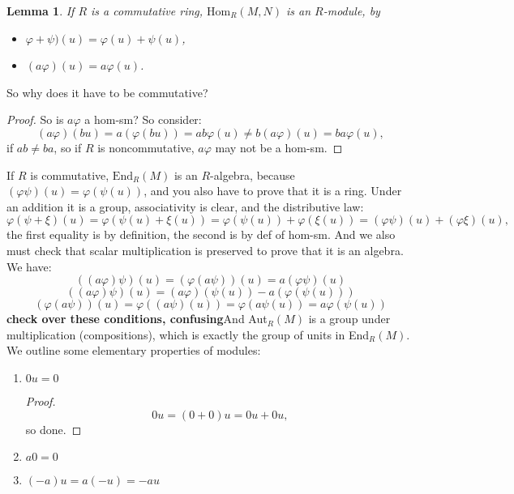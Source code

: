 \documentclass[9pt,reqno,twoside]{amsbook}
\theoremstyle{plain}
\numberwithin{section}{chapter}
\numberwithin{equation}{chapter}
\newtheorem{lem}[theorem]{Lemma}
\theoremstyle{definition}
\theoremstyle{remark}
\theoremstyle{plain}
\renewcommand{\phi}{\varphi}
\begin{document}
\begin{lem}
If $R$ is a commutative ring, $\text{Hom}_R(M,N)$ is an $R$-module, by 
\begin{itemize}
\item $\phi + \psi)(u) = \phi(u) + \psi(u)$,
\item $(a\phi)(u) = a\phi(u)$.
\end{itemize}
\end{lem}
So why does it have to be commutative?
\begin{proof}
So is $a\phi$ a hom-sm? So consider:
$$
(a\phi)(bu) = a(\phi(bu)) = ab\phi(u) \neq b(a\phi)(u) = ba\phi(u),
$$
if $ab \neq ba$, so if $R$ is noncommutative, $a\phi$ may not be a hom-sm. 
\end{proof}
If $R$ is commutative, $\text{End}_R(M)$ is an $R$-algebra, because $(\phi\psi)(u) = \phi(\psi(u))$, and you also have to prove that it is a ring. Under an addition it is a group, associativity is clear, and the distributive law:
$$
\phi(\psi + \xi)(u) = \phi(\psi(u) + \xi(u)) = \phi(\psi(u)) + \phi(\xi(u)) = (\phi\psi)(u) + (\phi\xi)(u),
$$
the first equality is by definition, the second is by def of hom-sm. And we also must check that scalar multiplication is preserved to prove that it is an algebra. We have:
$$
((a\phi)\psi)(u) = (\phi(a\psi))(u) = a(\phi\psi)(u)
$$
$$
((a\phi)\psi)(u) = (a\phi)(\psi(u)) - a(\phi(\psi(u)))
$$
$$
(\phi(a\psi))(u) = \phi((a\psi)(u)) = \phi(a\psi(u)) = a\phi(\psi(u))
$$
\textbf{check over these conditions, confusing}And Aut$_R(M)$ is a group under multiplication (compositions), which is exactly the group of units in End$_R(M)$. 
\vspace{3mm}
We outline some elementary properties of modules:
\begin{enumerate}
\item $0u = 0$
\begin{proof}
$$
0u = (0 + 0)u = 0u + 0u,
$$
so done. 
\end{proof}
\item $a0 = 0$
\item $(-a)u= a(-u) = -au$
\end{enumerate}
\end{document}
